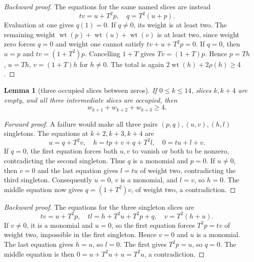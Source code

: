 \documentclass{article}
\newtheorem{lemma}{Lemma}
\DeclareMathOperator{\wt}{wt}
\begin{document}
\begin{proof}[Backward proof]
  The equations for the same named slices are instead
  \begin{equation}
    tv = u + T^2 p, \quad q = T^2 (u + p).
  \end{equation}
  Evaluation at one gives \(q(1) = 0\). If \(q \ne 0\), its weight is at least two. The remaining
  weight \(\wt(p) + \wt(u) + \wt(v)\) is at least two, since weight zero forces \(q = 0\) and
  weight one cannot satisfy \(tv + u + T^2 p = 0\). If \(q = 0\), then \(u = p\) and
  \(tv = (1 + T^2)p\). Cancelling \(1 + T\) gives \(Tv = (1 + T)p\). Hence \(p = Th\), \(u = Th\),
  \(v = (1 + T)h\) for \(h \ne 0\). The total is again \(2\wt(h) + 2\rho(h) \ge 4\).
\end{proof}

\begin{lemma}[three occupied slices between zeros]\label{lem:three}
  If \(0 \le k \le 14\), slices \(k, k + 4\) are empty, and all three intermediate slices are
  occupied, then
  \begin{equation}
    w_{k+1} + w_{k+2} + w_{k+3} \ge 4.
  \end{equation}
\end{lemma}

\begin{proof}[Forward proof]
  A failure would make all three pairs \((p,q), (u,v), (h,l)\) singletons. The equations at
  \(k + 2, k + 3, k + 4\) are
  \begin{equation}
    u = q + T^2 v, \quad h = tp + v + q + T^2 l, \quad 0 = tu + l + v.
  \end{equation}
  If \(q = 0\), the first equation forces both \(u, v\) to vanish or both to be nonzero,
  contradicting the second singleton. Thus \(q\) is a monomial and \(p = 0\). If \(u \ne 0\), then
  \(v = 0\) and the last equation gives \(l = tu\) of weight two, contradicting the third
  singleton. Consequently \(u = 0\), \(v\) is a monomial, and \(l = v\), so \(h = 0\). The middle
  equation now gives \(q = (1 + T^2)v\), of weight two, a contradiction.
\end{proof}

\begin{proof}[Backward proof]
  The equations for the three singleton slices are
  \begin{equation}
    tv = u + T^2 p, \quad tl = h + T^2 u + T^2 p + q, \quad v = T^2 (h + u).
  \end{equation}
  If \(v \ne 0\), it is a monomial and \(u = 0\), so the first equation forces \(T^2 p = tv\) of
  weight two, impossible in the first singleton. Hence \(v = 0\) and \(u\) is a monomial. The last
  equation gives \(h = u\), so \(l = 0\). The first gives \(T^2 p = u\), so \(q = 0\). The middle
  equation is then \(0 = u + T^2 u + u = T^2 u\), a contradiction.
\end{proof}
\end{document}
